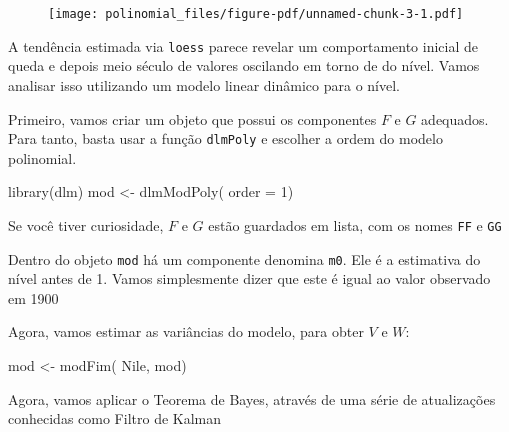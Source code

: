 \documentclass[
  letterpaper,
  DIV=11,
  numbers=noendperiod]{scrreprt}
\newenvironment{Shaded}{\begin{snugshade}}{\end{snugshade}}
\newcommand{\AttributeTok}[1]{\textcolor[rgb]{0.40,0.45,0.13}{#1}}
\newcommand{\DecValTok}[1]{\textcolor[rgb]{0.68,0.00,0.00}{#1}}
\newcommand{\FunctionTok}[1]{\textcolor[rgb]{0.28,0.35,0.67}{#1}}
\newcommand{\NormalTok}[1]{\textcolor[rgb]{0.00,0.23,0.31}{#1}}
\newcommand{\OtherTok}[1]{\textcolor[rgb]{0.00,0.23,0.31}{#1}}
\newcommand{\SpecialCharTok}[1]{\textcolor[rgb]{0.37,0.37,0.37}{#1}}
\begin{document}
\begin{figure}[H]

{\centering \texttt{[image: polinomial\_files/figure-pdf/unnamed-chunk-3-1.pdf]}

}

\end{figure}

A tendência estimada via \texttt{loess} parece revelar um comportamento
inicial de queda e depois meio século de valores oscilando em torno de
do nível. Vamos analisar isso utilizando um modelo linear dinâmico para
o nível.

Primeiro, vamos criar um objeto que possui os componentes \(F\) e \(G\)
adequados. Para tanto, basta usar a função \texttt{dlmPoly} e escolher a
ordem do modelo polinomial.

\begin{Shaded}
\begin{Highlighting}[]
\FunctionTok{library}\NormalTok{(dlm)}
\NormalTok{mod }\OtherTok{\textless{}{-}} \FunctionTok{dlmModPoly}\NormalTok{( }\AttributeTok{order =} \DecValTok{1}\NormalTok{)}
\end{Highlighting}
\end{Shaded}

Se você tiver curiosidade, \(F\) e \(G\) estão guardados em lista, com
os nomes \texttt{FF} e \texttt{GG}

Dentro do objeto \texttt{mod} há um componente denomina \texttt{m0}. Ele
é a estimativa do nível antes de 1. Vamos simplesmente dizer que este é
igual ao valor observado em 1900

\begin{Shaded}
\end{Shaded}

Agora, vamos estimar as variâncias do modelo, para obter \(V\) e \(W\):

\begin{Shaded}
\begin{Highlighting}[]
\NormalTok{mod }\OtherTok{\textless{}{-}} \FunctionTok{modFim}\NormalTok{( Nile, mod)}
\end{Highlighting}
\end{Shaded}

Agora, vamos aplicar o Teorema de Bayes, através de uma série de
atualizações conhecidas como Filtro de Kalman
\end{document}
